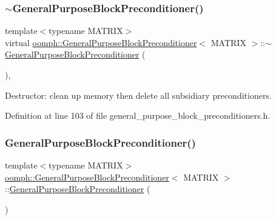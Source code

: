 \subsubsection{\texorpdfstring{$\sim$\+General\+Purpose\+Block\+Preconditioner()}{~GeneralPurposeBlockPreconditioner()}}
{\footnotesize\ttfamily template$<$typename M\+A\+T\+R\+IX$>$ \\
virtual \hyperlink{classoomph_1_1GeneralPurposeBlockPreconditioner}{oomph\+::\+General\+Purpose\+Block\+Preconditioner}$<$ M\+A\+T\+R\+IX $>$\+::$\sim$\hyperlink{classoomph_1_1GeneralPurposeBlockPreconditioner}{General\+Purpose\+Block\+Preconditioner} (\begin{DoxyParamCaption}{ }\end{DoxyParamCaption})\hspace{0.3cm}{\ttfamily [inline]}, {\ttfamily [virtual]}}

Destructor\+: clean up memory then delete all subsidiary preconditioners. 

Definition at line 103 of file general\+\_\+purpose\+\_\+block\+\_\+preconditioners.\+h.

\mbox{\label{classoomph_1_1GeneralPurposeBlockPreconditioner_ab51a9cf7efc0f0f60c122e0ab845a9ea}} 
\subsubsection{\texorpdfstring{General\+Purpose\+Block\+Preconditioner()}{GeneralPurposeBlockPreconditioner()}\hspace{0.1cm}{\footnotesize\ttfamily [2/2]}}
{\footnotesize\ttfamily template$<$typename M\+A\+T\+R\+IX$>$ \\
\hyperlink{classoomph_1_1GeneralPurposeBlockPreconditioner}{oomph\+::\+General\+Purpose\+Block\+Preconditioner}$<$ M\+A\+T\+R\+IX $>$\+::\hyperlink{classoomph_1_1GeneralPurposeBlockPreconditioner}{General\+Purpose\+Block\+Preconditioner} (\begin{DoxyParamCaption}\item[{const \hyperlink{classoomph_1_1GeneralPurposeBlockPreconditioner}{General\+Purpose\+Block\+Preconditioner}$<$ M\+A\+T\+R\+IX $>$ \&}]{ }\end{DoxyParamCaption})\hspace{0.3cm}{\ttfamily [inline]}}



